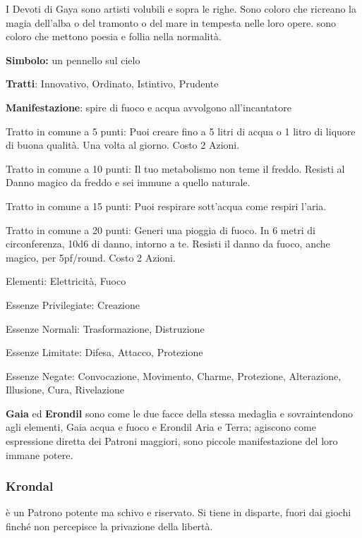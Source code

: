 \documentclass[a4paper,11pt,twoside,openany]{book}
\begin{document}
I Devoti di Gaya sono artisti volubili e sopra le righe. Sono coloro che ricreano la magia dell'alba o del tramonto o del mare in tempesta nelle loro opere. sono coloro che mettono poesia e follia nella normalità.

\textbf{Simbolo:} un pennello sul cielo

\textbf{Tratti}: Innovativo, Ordinato, Istintivo, Prudente

\textbf{Manifestazione}: spire di fuoco e acqua avvolgono all'incantatore

\bigskip

Tratto in comune a 5 punti: Puoi creare fino a 5 litri di acqua o 1 litro di liquore di buona qualità. Una volta al giorno. Costo 2 Azioni.

Tratto in comune a 10 punti: Il tuo metabolismo non teme il freddo. Resisti al Danno magico da freddo e sei immune a quello naturale.

Tratto in comune a 15 punti: Puoi respirare sott'acqua come respiri l'aria.

Tratto in comune a 20 punti: Generi una pioggia di fuoco. In 6 metri di circonferenza, 10d6 di danno, intorno a te. Resisti il danno da fuoco, anche magico, per 5pf/round. Costo 2 Azioni.

\bigskip

Elementi: Elettricità, Fuoco

\bigskip

Essenze Privilegiate: Creazione

Essenze Normali: Trasformazione, Distruzione

Essenze Limitate: Difesa, Attacco, Protezione

Essenze Negate: Convocazione, Movimento, Charme, Protezione, Alterazione, Illusione, Cura, Rivelazione

\bigskip

\textbf{Gaia} ed \textbf{Erondil} sono come le due facce della stessa medaglia e sovraintendono agli elementi, Gaia acqua e fuoco e Erondil Aria e Terra; agiscono come espressione diretta dei Patroni maggiori, sono piccole manifestazione del loro immane potere.

\subsubsection{Krondal}

\label{krondal}

è un Patrono potente ma schivo e riservato. Si tiene in disparte, fuori dai giochi finché non percepisce la privazione della libertà.
\end{document}
